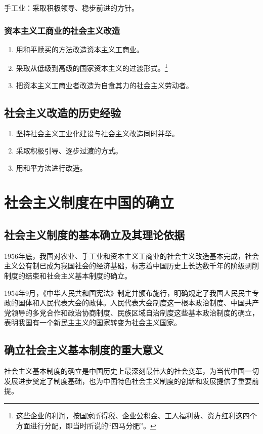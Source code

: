         手工业：采取积极领导、稳步前进的方针。

        \subsubsection{资本主义工商业的社会主义改造}
        \begin{enumerate}
            \item 用和平赎买的方法改造资本主义工商业。
            \item 采取从低级到高级的国家资本主义的过渡形式。\footnote{这些企业的利润，按国家所得税、企业公积金、工人福利费、资方红利这四个方面进行分配，即当时所说的“四马分肥”。}
            \item 把资本主义工商业者改造为自食其力的社会主义劳动者。
        \end{enumerate}

    \subsection{社会主义改造的历史经验}
    \begin{enumerate}
        \item 坚持社会主义工业化建设与社会主义改造同时并举。
        \item 采取积极引导、逐步过渡的方式。
        \item 用和平方法进行改造。
    \end{enumerate}


\section{社会主义制度在中国的确立}

    \subsection{社会主义制度的基本确立及其理论依据}
    1956年底，我国对农业、手工业和资本主义工商业的社会主义改造基本完成，社会主义公有制已成为我国社会的经济基础，标志着中国历史上长达数千年的阶级剥削制度的结束和社会主义基本制度的确立。

    1954年9月，《中华人民共和国宪法》制定并颁布施行，明确规定了我国人民民主专政的国体和人民代表大会的政体。人民代表大会制度这一根本政治制度、中国共产党领导的多党合作和政治协商制度、民族区域自治制度这些基本政治制度的确立，表明我国有一个新民主主义的国家转变为社会主义国家。

    \subsection{确立社会主义基本制度的重大意义}
    社会主义基本制度的确立是中国历史上最深刻最伟大的社会变革，为当代中国一切发展进步奠定了制度基础，也为中国特色社会主义制度的创新和发展提供了重要前提。